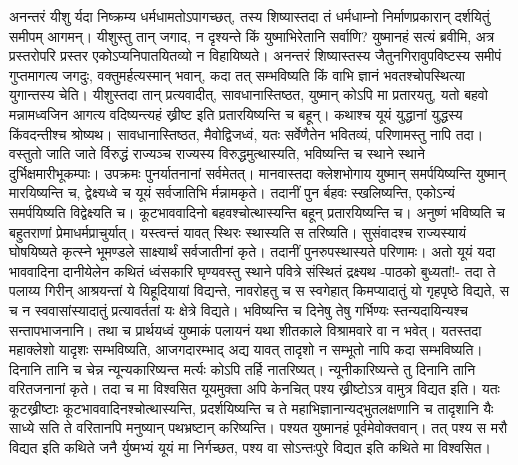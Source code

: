 \adhyAya
{}
\vakya अनन्तरं यीशु र्यदा निष्क्रम्य धर्मधामतोऽपागच्छत्, तस्य शिष्यास्तदा तं धर्मधाम्नो निर्माणप्रकारान् दर्शयितुं समीपम् आगमन्।
\vakya यीशुस्तु तान् जगाद, न दृश्यन्ते किं युष्माभिरेतानि सर्वाणि? युष्मानहं सत्यं ब्रवीमि, अत्र प्रस्तरोपरि प्रस्तर एकोऽप्यनिपातयितव्यो न विहायिष्यते।
\vakya अनन्तरं शिष्यास्तस्य जैतुनगिरावुपविष्टस्य समीपं गुप्तमागत्य जगदुः, वक्तुमर्हत्यस्मान् भवान्, कदा तत् सम्भविष्यति किं वाभि ज्ञानं भवतश्चोपस्थित्या युगान्तस्य चेति।
\vakya यीशुस्तदा तान् प्रत्यवादीत्, सावधानास्तिष्ठत, युष्मान् कोऽपि मा प्रतारयतु,
\vakya यतो बहवो मन्नामध्वजिन आगत्य वदिष्यन्त्यहं ख्रीष्ट इति प्रतारयिष्यन्ति च बहून्।
\vakya कथाश्च यूयं युद्धानां युद्धस्य किंवदन्तीश्च श्रोष्यथ। सावधानास्तिष्ठत, मैवोद्विजध्वं, यतः सर्वेणैतेन भवितव्यं, परिणामस्तु नापि तदा।
\vakya वस्तुतो जाति जाते र्विरुद्धं राज्यञ्च राज्यस्य विरुद्धमुत्थास्यति, भविष्यन्ति च स्थाने स्थाने दुर्भिक्षमारीभूकम्पाः।
\vakya उपक्रमः पुनर्यातनानां सर्वमेतत्।
\vakya मानवास्तदा क्लेशभोगाय युष्मान् समर्पयिष्यन्ति युष्मान् मारयिष्यन्ति च, द्वेक्ष्यध्वे च यूयं सर्वजातिभि र्मन्नामकृते।
\vakya तदानीं पुन र्बहवः स्खलिष्यन्ति, एकोऽन्यं समर्पयिष्यति विद्वेक्ष्यति च।
\vakya कूटभाववादिनो बहवश्चोत्थास्यन्ति बहून् प्रतारयिष्यन्ति च।
\vakya अनुष्णं भविष्यति च बहुतराणां प्रेमाधर्मप्राचुर्यात्।
\vakya यस्त्वन्तं यावत् स्थिरः स्थास्यति स तरिष्यति।
\vakya सुसंवादश्च राज्यस्यायं घोषयिष्यते कृत्स्ने भूमण्डले साक्ष्यार्थं सर्वजातीनां कृते। तदानीं पुनरुपस्थास्यते परिणामः।
\vakya अतो यूयं यदा भाववादिना दानीयेलेन कथितं ध्वंसकारि घृण्यवस्तु स्थाने पवित्रे संस्थितं द्रक्ष्यथ -पाठको बुध्यतां!-
\vakya तदा ते पलाय्य गिरीन् आश्रयन्तां ये यिहूदियायां विद्यन्ते,
\vakya नावरोहतु च स स्वगेहात् किमप्यादातुं यो गृहपृष्ठे विद्यते,
\vakya स च न स्ववासांस्यादातुं प्रत्यावर्ततां यः क्षेत्रे विद्यते।
\vakya भविष्यन्ति च दिनेषु तेषु गर्भिण्यः स्तन्यदायिन्यश्च सन्तापभाजनानि।
\vakya तथा च प्रार्थयध्वं युष्माकं पलायनं यथा शीतकाले विश्रामवारे वा न भवेत्।
\vakya यतस्तदा महाक्लेशो यादृशः सम्भविष्यति, आजगदारम्भाद् अद्य यावत् तादृशो न सम्भूतो नापि कदा सम्भविष्यति।
\vakya दिनानि तानि च चेन्न न्यून्यकारिष्यन्त मर्त्यः कोऽपि तर्हि नातरिष्यत्। न्यूनीकारिष्यन्ते तु दिनानि तानि वरितजनानां कृते।
\vakya तदा च मा विश्वसित यूयमुक्ता अपि केनचित् पश्य ख्रीष्टोऽत्र वामुत्र विद्यत इति।
\vakya यतः कूटख्रीष्टाः कूटभाववादिनश्चोत्थास्यन्ति, प्रदर्शयिष्यन्ति च ते महाभिज्ञानान्यद्भुतलक्षणानि च तादृशानि यैः साध्ये सति ते वरितानपि मनुष्यान् पथभ्रष्टान् करिष्यन्ति।
\vakya पश्यत युष्मानहं पूर्वमेवोक्तवान्।
\vakya तत् पश्य स मरौ विद्यत इति कथिते जनै र्युष्मभ्यं यूयं मा निर्गच्छत, पश्य वा सोऽन्तःपुरे विद्यत इति कथिते मा विश्वसित।
